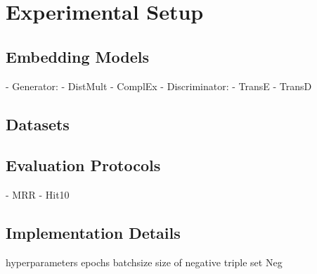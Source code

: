 \section{Experimental Setup}

\subsection{Embedding Models}
- Generator:
    - DistMult
    - ComplEx
- Discriminator:
    - TransE
    - TransD
    
    
\subsection{Datasets}
\label{subsec:datasets}


\subsection{Evaluation Protocols}

- MRR
- Hit\@10

\subsection{Implementation Details}
hyperparameters
epochs
batchsize
size of negative triple set Neg